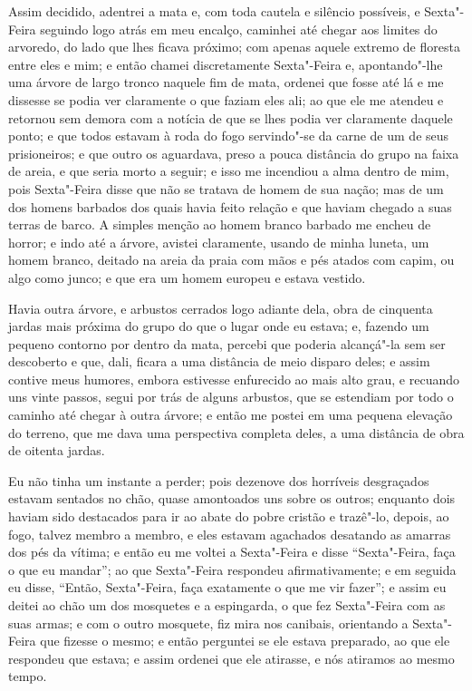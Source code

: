 Assim decidido, adentrei a mata e, com toda cautela e silêncio
possíveis, e Sexta"-Feira seguindo logo atrás em meu encalço, caminhei
até chegar aos limites do arvoredo, do lado que lhes ficava próximo; com
apenas aquele extremo de floresta entre eles e mim; e então chamei
discretamente Sexta"-Feira e, apontando"-lhe uma árvore de largo tronco
naquele fim de mata, ordenei que fosse até lá e me dissesse se podia ver
claramente o que faziam eles ali; ao que ele me atendeu e retornou sem
demora com a notícia de que se lhes podia ver claramente daquele ponto;
e que todos estavam à roda do fogo servindo"-se da carne de um de seus
prisioneiros; e que outro os aguardava, preso a pouca distância do grupo
na faixa de areia, e que seria morto a seguir; e isso me incendiou a
alma dentro de mim, pois Sexta"-Feira disse que não se tratava de homem
de sua nação; mas de um dos homens barbados dos quais havia feito
relação e que haviam chegado a suas terras de barco. A simples menção ao
homem branco barbado me encheu de horror; e indo até a árvore, avistei
claramente, usando de minha luneta, um homem branco, deitado na areia da
praia com mãos e pés atados com capim, ou algo como junco; e que era um
homem europeu e estava vestido.

Havia outra árvore, e arbustos cerrados logo adiante dela, obra de
cinquenta jardas mais próxima do grupo do que o lugar onde eu estava; e,
fazendo um pequeno contorno por dentro da mata, percebi que poderia
alcançá"-la sem ser descoberto e que, dali, ficara a uma distância de
meio disparo deles; e assim contive meus humores, embora estivesse
enfurecido ao mais alto grau, e recuando uns vinte passos, segui por
trás de alguns arbustos, que se estendiam por todo o caminho até chegar
à outra árvore; e então me postei em uma pequena elevação do terreno,
que me dava uma perspectiva completa deles, a uma distância de obra de
oitenta jardas.

Eu não tinha um instante a perder; pois dezenove dos horríveis
desgraçados estavam sentados no chão, quase amontoados uns sobre os
outros; enquanto dois haviam sido destacados para ir ao abate do pobre
cristão e trazê"-lo, depois, ao fogo, talvez membro a membro, e eles
estavam agachados desatando as amarras dos pés da vítima; e então eu me
voltei a Sexta"-Feira e disse ``Sexta"-Feira, faça o que eu mandar''; ao
que Sexta"-Feira respondeu afirmativamente; e em seguida eu disse,
``Então, Sexta"-Feira, faça exatamente o que me vir fazer''; e assim eu
deitei ao chão um dos mosquetes e a espingarda, o que fez Sexta"-Feira
com as suas armas; e com o outro mosquete, fiz mira nos canibais,
orientando a Sexta"-Feira que fizesse o mesmo; e então perguntei se ele
estava preparado, ao que ele respondeu que estava; e assim ordenei que
ele atirasse, e nós atiramos ao mesmo tempo.

